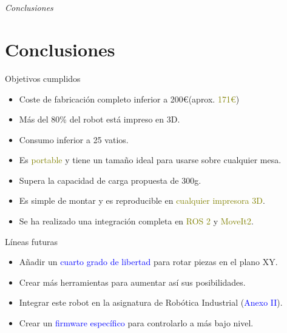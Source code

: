 \documentclass{beamer}
\begin{document}
\section*{}
\begin{frame}{}
  \centering \Huge
  \emph{Conclusiones}
\end{frame}

\section{Conclusiones}

\begin{frame}
\begin{block}{Objetivos cumplidos}
\begin{itemize}
\item Coste de fabricación completo inferior a 200\euro\xspace(aprox. \textcolor{olive}{171\euro})
\item Más del 80\% del robot está impreso en 3D.
\item Consumo inferior a 25 vatios.
\item Es \textcolor{olive}{portable} y tiene un tamaño ideal para usarse sobre cualquier mesa.
\item Supera la capacidad de carga propuesta de 300g.
\item Es simple de montar y es reproducible en \textcolor{olive}{cualquier impresora 3D}.
\item Se ha realizado una integración completa en \textcolor{olive}{ROS 2} y \textcolor{olive}{MoveIt2}.
\end{itemize}
\end{block}
\end{frame}

\begin{frame}
\begin{block}{Líneas futuras}
  \begin{itemize}
  \item Añadir un \textcolor{blue}{cuarto grado de libertad} para rotar piezas en el plano XY.
  \item Crear más herramientas para aumentar así sus posibilidades.
  \item Integrar este robot en la asignatura de Robótica Industrial (\textcolor{blue}{Anexo II}).
  \item Crear un \textcolor{blue}{firmware específico} para controlarlo a más bajo nivel.
  \end{itemize}
  \end{block}
\end{frame}

\begin{frame}[plain]
\large{\titlepage}
\end{frame}
\end{document}

